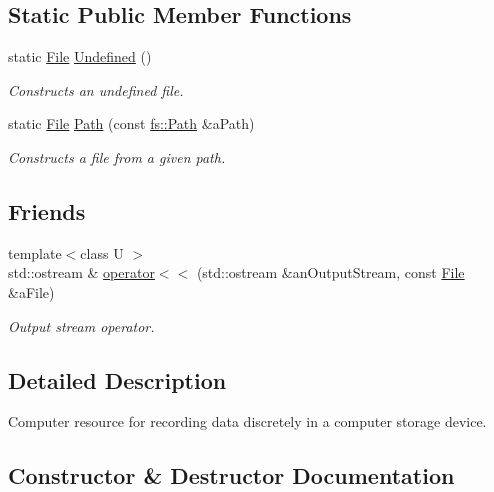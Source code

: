 \subsection*{Static Public Member Functions}
\begin{DoxyCompactItemize}
\item 
static \hyperlink{classlibrary_1_1core_1_1fs_1_1_file}{File} \hyperlink{classlibrary_1_1core_1_1fs_1_1_file_a985adb1a33b94dcdbed2792651eb81af}{Undefined} ()
\begin{DoxyCompactList}\small\item\em Constructs an undefined file. \end{DoxyCompactList}\item 
static \hyperlink{classlibrary_1_1core_1_1fs_1_1_file}{File} \hyperlink{classlibrary_1_1core_1_1fs_1_1_file_a0e0d8a8becb3cdd21775554e181452d8}{Path} (const \hyperlink{classlibrary_1_1core_1_1fs_1_1_path}{fs\+::\+Path} \&a\+Path)
\begin{DoxyCompactList}\small\item\em Constructs a file from a given path. \end{DoxyCompactList}\end{DoxyCompactItemize}
\subsection*{Friends}
\begin{DoxyCompactItemize}
\item 
{\footnotesize template$<$class U $>$ }\\std\+::ostream \& \hyperlink{classlibrary_1_1core_1_1fs_1_1_file_aedbcccb29459f2d30d54a53b6850fbd2}{operator$<$$<$} (std\+::ostream \&an\+Output\+Stream, const \hyperlink{classlibrary_1_1core_1_1fs_1_1_file}{File} \&a\+File)
\begin{DoxyCompactList}\small\item\em Output stream operator. \end{DoxyCompactList}\end{DoxyCompactItemize}


\subsection{Detailed Description}
Computer resource for recording data discretely in a computer storage device. 

\subsection{Constructor \& Destructor Documentation}
\mbox{\label{classlibrary_1_1core_1_1fs_1_1_file_a7490060f19a21d4ee58bb6cec87a1ca6}} 

